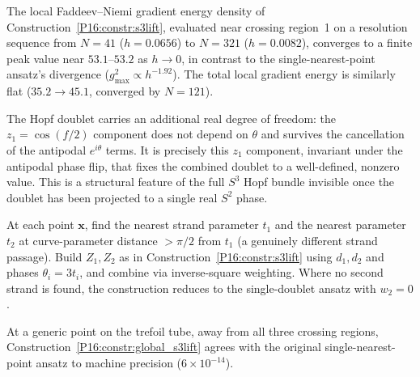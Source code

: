 \begin{theorem}
\label{P16:thm:s3_bounded_energy}
The local Faddeev--Niemi gradient energy density of
Construction~\ref{P16:constr:s3lift}, evaluated near crossing region~1 on a
resolution sequence from $N=41$ ($h=0.0656$) to $N=321$ ($h=0.0082$),
converges to a finite peak value near $53.1$--$53.2$ as $h\to0$, in
contrast to the single-nearest-point ansatz's divergence
($g^2_{\max}\propto h^{-1.92}$). The total local gradient energy is
similarly flat ($35.2\to45.1$, converged by $N=121$).
\end{theorem}

\begin{remark}
\label{P16:rem:why_s3_works}
The Hopf doublet carries an additional real degree of freedom: the
$z_1=\cos(f/2)$ component does not depend on $\theta$ and survives the
cancellation of the antipodal $e^{i\theta}$ terms. It is precisely this
$z_1$ component, invariant under the antipodal phase flip, that fixes
the combined doublet to a well-defined, nonzero value. This is a
structural feature of the full $S^3$ Hopf bundle invisible once the
doublet has been projected to a single real $S^2$ phase.
\end{remark}

\begin{construction}
\label{P16:constr:global_s3lift}
At each point $\mathbf{x}$, find the nearest strand parameter $t_1$
and the nearest parameter $t_2$ at curve-parameter distance $>\pi/2$
from $t_1$ (a genuinely different strand passage). Build $Z_1,Z_2$ as
in Construction~\ref{P16:constr:s3lift} using $d_1,d_2$ and phases
$\theta_i=3t_i$, and combine via inverse-square weighting. Where no
second strand is found, the construction reduces to the single-doublet
ansatz with $w_2=0$.
\end{construction}

\begin{proposition}
\label{P16:prop:reduces_away}
At a generic point on the trefoil tube, away from all three crossing
regions, Construction~\ref{P16:constr:global_s3lift} agrees with the original
single-nearest-point ansatz to machine precision ($6\times10^{-14}$).
\end{proposition}

